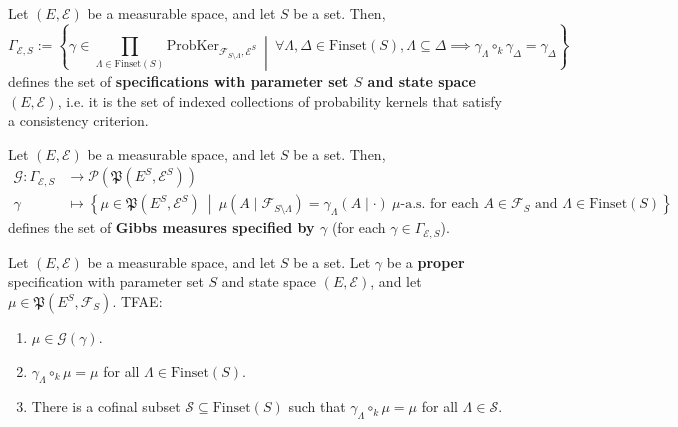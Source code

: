 \begin{definition}[Specification]
    \label{def:specification}
    \leanok
    Let $(E,\mathcal{E})$ be a measurable space, and let $S$ be a set. Then,
    \begin{equation*}
        \Gamma_{\mathcal{E},S}:=\left\{\gamma\in\prod_{\Lambda\in\text{Finset}(S)}\text{ProbKer}_{\mathcal{F}_{S\setminus\Lambda},\mathcal{E}^S}~\middle\vert~ \forall \Lambda,\Delta\in\text{Finset}(S),\Lambda\subseteq\Delta\implies\gamma_\Lambda\circ_k\gamma_\Delta=\gamma_\Delta\right\}
    \end{equation*}
    defines the set of \textbf{specifications with parameter set $S$ and state space $(E,\mathcal{E})$}, i.e. it is the set of indexed collections of probability kernels that satisfy a consistency criterion.
\end{definition}

\begin{definition}
    \label{def:gibbsMeasures}

    Let $(E,\mathcal{E})$ be a measurable space, and let $S$ be a set. Then,
    \begin{align*}
        \mathcal{G}:\Gamma_{\mathcal{E},S}&\to\mathcal{P}(\mathfrak{P}(E^S,\mathcal{E}^S))\\
        \gamma&\mapsto\left\{\mu\in\mathfrak{P}(E^S,\mathcal{E}^S)~\middle\vert~\mu(A\mid\mathcal{F}_{S\setminus\Lambda})=\gamma_\Lambda(A\mid\cdot)~\mu\text{-a.s. for each } A\in\mathcal{F}_S\text{ and }\Lambda\in\text{Finset}(S)\right\}
    \end{align*}
    defines the set of \textbf{Gibbs measures specified by $\gamma$} (for each $\gamma\in\Gamma_{\mathcal{E},S}$).
\end{definition}

\begin{lemma}
    \label{lem:char_gibbsMeasures}
    
    Let $(E,\mathcal{E})$ be a measurable space, and let $S$ be a set. Let $\gamma$ be a \textbf{proper} specification with parameter set $S$ and state space $(E,\mathcal{E})$, and let $\mu\in\mathfrak{P}(E^S,\mathcal{F}_S)$. TFAE:
    \begin{enumerate}
        \item $\mu\in\mathcal{G}(\gamma)$.
        \item $\gamma_\Lambda\circ_k\mu=\mu$ for all $\Lambda\in\text{Finset}(S)$.
        \item There is a cofinal subset $\mathcal{S}\subseteq\text{Finset}(S)$ such that $\gamma_\Lambda\circ_k\mu=\mu$ for all $\Lambda\in\mathcal{S}$.
    \end{enumerate}
\end{lemma}

